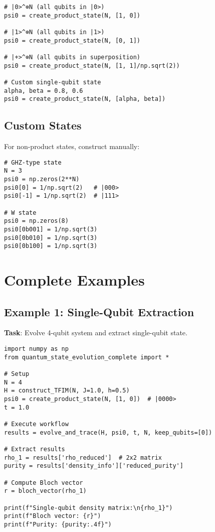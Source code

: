 \documentclass[11pt,a4paper]{article}
\begin{document}
\begin{lstlisting}[caption={Product state creation}]
# |0>^⊗N (all qubits in |0>)
psi0 = create_product_state(N, [1, 0])

# |1>^⊗N (all qubits in |1>)
psi0 = create_product_state(N, [0, 1])

# |+>^⊗N (all qubits in superposition)
psi0 = create_product_state(N, [1, 1]/np.sqrt(2))

# Custom single-qubit state
alpha, beta = 0.8, 0.6
psi0 = create_product_state(N, [alpha, beta])
\end{lstlisting}

\subsection{Custom States}

For non-product states, construct manually:

\begin{lstlisting}[caption={Custom initial state}]
# GHZ-type state
N = 3
psi0 = np.zeros(2**N)
psi0[0] = 1/np.sqrt(2)   # |000>
psi0[-1] = 1/np.sqrt(2)  # |111>

# W state
psi0 = np.zeros(8)
psi0[0b001] = 1/np.sqrt(3)
psi0[0b010] = 1/np.sqrt(3)
psi0[0b100] = 1/np.sqrt(3)
\end{lstlisting}

\section{Complete Examples}

\subsection{Example 1: Single-Qubit Extraction}

\textbf{Task}: Evolve 4-qubit system and extract single-qubit state.

\begin{lstlisting}[caption={Single-qubit extraction}]
import numpy as np
from quantum_state_evolution_complete import *

# Setup
N = 4
H = construct_TFIM(N, J=1.0, h=0.5)
psi0 = create_product_state(N, [1, 0])  # |0000>
t = 1.0

# Execute workflow
results = evolve_and_trace(H, psi0, t, N, keep_qubits=[0])

# Extract results
rho_1 = results['rho_reduced']  # 2x2 matrix
purity = results['density_info']['reduced_purity']

# Compute Bloch vector
r = bloch_vector(rho_1)

print(f"Single-qubit density matrix:\n{rho_1}")
print(f"Bloch vector: {r}")
print(f"Purity: {purity:.4f}")
\end{lstlisting}
\end{document}
